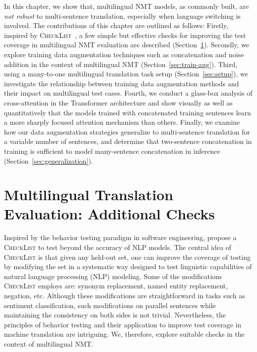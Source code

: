 In this chapter, we show that, multilingual NMT models, as commonly built, are \textit{not robust} to multi-sentence translation, especially when language switching is involved. The contributions of this chapter are outlined as follows:
Firstly, inspired by \textsc{CheckList}~\cite{ribeiro-etal-2020-beyond}, a few simple but effective checks for improving the test coverage in multilingual NMT evaluation are described (Section~\ref{sec:multiling-mt-checks}).
Secondly, we explore training data augmentation techniques such as concatenation and noise addition in the context of multilingual NMT (Section~\ref{sec:train-aug}).
Third, using a many-to-one multilingual translation task setup (Section~\ref{sec:setup}), we investigate the relationship between training data augmentation methods and their impact on multilingual test cases. 
Fourth, we conduct a glass-box analysis of cross-attention in the Transformer architecture and show visually as well as quantitatively that the models trained with concatenated training sentences learn a more sharply focused attention mechanism than others.
Finally, we examine how our data augmentation strategies generalize to multi-sentence translation for a variable number of sentences, and determine that two-sentence concatenation in training is sufficient to model many-sentence concatenation in inference (Section~\ref{sec:generalization}). 



\section{Multilingual Translation Evaluation: Additional Checks}
\label{sec:multiling-mt-checks}

Inspired by the behavior testing paradigm in software engineering, \citet{ribeiro-etal-2020-beyond} propose a \textsc{CheckList} to test beyond the accuracy of NLP models.
The central idea of \textsc{CheckList} is that given any held-out set, one can improve the coverage of testing by modifying the set in a systematic way designed to test linguistic capabilities of natural language processing (NLP) modeling.
Some of the modifications \textsc{CheckList} employs are: synonym replacement, named entity replacement, negation, etc. 
Although these modifications are straightforward in tasks such as sentiment classification, such modifications on parallel sentences while maintaining the consistency on both sides is not trivial.
Nevertheless, the principles of behavior testing and their application to improve test coverage in machine translation are intriguing. 
We, therefore, explore suitable checks in the context of multilingual NMT. 

